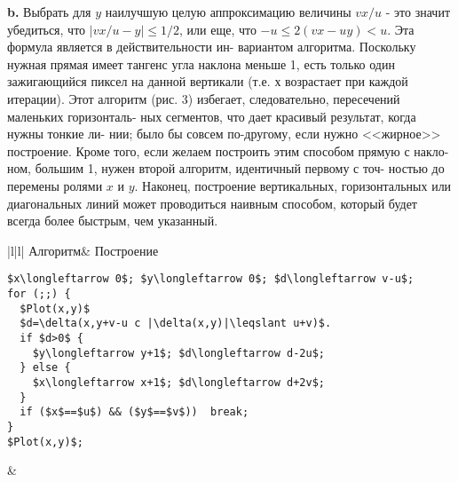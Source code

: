 \textbf{b.} Выбрать для $y$ наилучшую целую аппроксимацию величины $vx/u$\linebreak
- это значит убедиться, что $|vx/u-y|\leqslant 1/2$, или еще, что\linebreak
$-u\leqslant2(vx-uy)<u$. Эта формула является в действительности ин-\linebreak
вариантом алгоритма. Поскольку нужная прямая имеет тангенс угла\linebreak
наклона меньше 1, есть только один зажигающийся пиксел на данной\linebreak
вертикали (т.е. $х$ возрастает при каждой итерации). Этот алгоритм\linebreak
(рис. 3) избегает, следовательно, пересечений маленьких горизонталь-\linebreak
ных сегментов, что дает красивый результат, когда нужны тонкие ли-\linebreak
нии; было бы совсем по-другому, если нужно <<жирное>> построение.\newline
\hspace*{15pt}Кроме того, если желаем построить этим способом прямую с накло-\linebreak
ном, большим 1, нужен второй алгоритм, идентичный первому с точ-\linebreak
ностью до перемены ролями $x$ и $y$. Наконец, построение вертикальных,\linebreak
горизонтальных или диагональных линий может проводиться наивным\linebreak
способом, который будет всегда более быстрым, чем указанный.\newline
\begin{center}
\begin{tabular}{|l|l|}
\hline
\hspace*{50pt}Алгоритм&
\hspace{5pt}Построение\\
{\begin{lstlisting}[mathescape=true, frame=none]
$x\longleftarrow 0$; $y\longleftarrow 0$; $d\longleftarrow v-u$;
for (;;) {
  $Plot(x,y)$
  $d=\delta(x,y+v-u c |\delta(x,y)|\leqslant u+v)$.
  if $d>0$ {
    $y\longleftarrow y+1$; $d\longleftarrow d-2u$;
  } else {
    $x\longleftarrow x+1$; $d\longleftarrow d+2v$;
  }
  if ($x$==$u$) && ($y$==$v$))  break;
}
$Plot(x,y)$;
\end{lstlisting}}
&
\\
\hline
\end{tabular}
\end{center}
